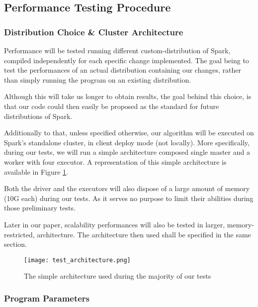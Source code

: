 \documentclass{eplmastersthesis}
\begin{document}
\subsection{Performance Testing Procedure}

\subsubsection{Distribution Choice \& Cluster Architecture}

Performance will be tested running different custom-distribution of Spark, compiled independently for each specific change implemented. The goal being to test the performances of an actual distribution containing our changes, rather than simply running the program on an existing distribution. \newline

Although this will take us longer to obtain results, the goal behind this choice, is that our code could then easily be proposed as the standard for future distributions of Spark.  \newline

Additionally to that, unless specified otherwise, our algorithm will be executed on Spark's standalone cluster, in client deploy mode (not locally). More specifically, during our tests, we will run a simple architecture composed single master and a worker with four executor. A representation of this simple architecture is available in Figure \ref{fig:test_architecture}.\newline

Both the driver and the executors will also dispose of a large amount of memory (10G each) during our tests. As it serves no purpose to limit their abilities during those preliminary tests. \newline

Later in our paper, scalability performances will also be tested in larger, memory-restricted, architecture. The architecture then used shall be specified in the same section.

\begin{figure}[h]
  \centering
  \texttt{[image: test\_architecture.png]}
  \caption{The simple architecture used during the majority of our tests}
  \label{fig:test_architecture}
\end{figure}

\subsubsection{Program Parameters}
\end{document}
